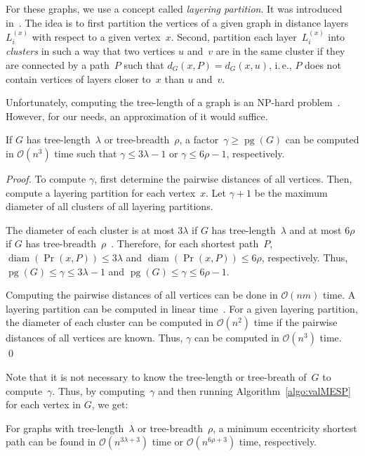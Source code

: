 \documentclass[10pt]{llncs}
\makeatletter
\newcommand{\calO}{\mathcal{O}}
\newcommand{\ie}{i.\,e.\@ifnextchar{,}{}{~}}
\DeclareMathOperator{\pg}{pg}
\DeclareMathOperator{\diam}{diam}
\makeatother
\begin{document}
For these graphs, we use a concept called \emph{layering partition}.
It was introduced in~\cite{BranChepDrag1999,ChepoiDragan2000}.
The idea is to first partition the vertices of a given graph in distance layers~$L_i^{(x)}$ with respect to a given vertex~$x$.
Second, partition each layer~$L_i^{(x)}$ into \emph{clusters} in such a way that two vertices $u$ and~$v$ are in the same cluster if they are connected by a path~$P$ such that $d_G(x, P) = d_G(x, u)$, \ie, $P$ does not contain vertices of layers closer to~$x$ than $u$ and~$v$.

Unfortunately, computing the tree-length of a graph is an NP-hard problem~\cite{Lokshtanov2010}.
However, for our needs, an approximation of it would suffice.

\begin{lemma}
If $G$ has tree-length~$\lambda$ or tree-breadth~$\rho$, a factor~$\gamma \geq \pg(G)$ can be computed in $\calO(n^3)$ time such that $\gamma \leq 3 \lambda - 1$ or $\gamma \leq 6 \rho - 1$, respectively.
\end{lemma}

\begin{proof}
To compute $\gamma$, first determine the pairwise distances of all vertices.
Then, compute a layering partition for each vertex~$x$.
Let $\gamma + 1$ be the maximum diameter of all clusters of all layering partitions.

The diameter of each cluster is at most $3 \lambda$ if $G$ has tree-length~$\lambda$ and at most $6 \rho$ if $G$ has tree-breadth~$\rho$~\cite{DouDraGavYan2007,DraganKohler2014}.
Therefore, for each shortest path~$P$, $\diam(\Pr(x, P)) \leq 3 \lambda$ and $\diam(\Pr(x, P)) \leq 6 \rho$, respectively.
Thus, $\pg(G) \leq \gamma \leq 3 \lambda - 1$ and $\pg(G) \leq \gamma \leq 6 \rho - 1$.

Computing the pairwise distances of all vertices can be done in $\calO(nm)$ time.
A layering partition can be computed in linear time~\cite{ChepoiDragan2000}.
For a given layering partition, the diameter of each cluster can be computed in $\calO(n^2)$ time if the pairwise distances of all vertices are known.
Thus, $\gamma$ can be computed in $\calO(n^3)$ time.
\qed
\end{proof}

Note that it is not necessary to know the tree-length or tree-breath of~$G$ to compute~$\gamma$.
Thus, by computing~$\gamma$ and then running Algorithm~\ref{algo:valMESP} for each vertex in $G$, we get:

\begin{corollary}
For graphs with tree-length~$\lambda$ or tree-breadth~$\rho$, a minimum eccentricity shortest path can be found in $\calO(n^{3\lambda+3})$ time or $\calO(n^{6\rho+3})$ time, respectively.
\end{corollary}
\end{document}
